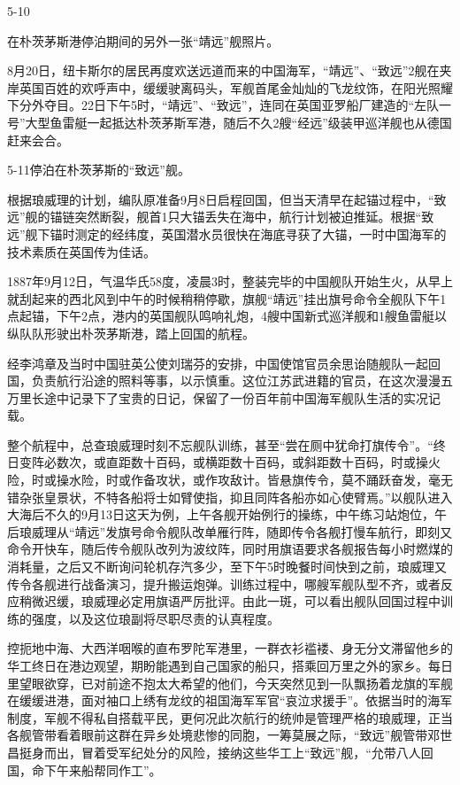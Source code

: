 \documentclass[12pt,UTF8]{ctexbook}
\begin{document}
5-10

在朴茨茅斯港停泊期间的另外一张“靖远”舰照片。

8月20日，纽卡斯尔的居民再度欢送远道而来的中国海军，“靖远”、“致远”2舰在夹岸英国百姓的欢呼声中，缓缓驶离码头，军舰首尾金灿灿的飞龙纹饰，在阳光照耀下分外夺目。22日下午5时，“靖远”、“致远”，连同在英国亚罗船厂建造的“左队一号”大型鱼雷艇一起抵达朴茨茅斯军港，随后不久2艘“经远”级装甲巡洋舰也从德国赶来会合。

5-11停泊在朴茨茅斯的“致远”舰。

根据琅威理的计划，编队原准备9月8日启程回国，但当天清早在起锚过程中，“致远”舰的锚链突然断裂，舰首1只大锚丢失在海中，航行计划被迫推延。根据“致远”舰下锚时测定的经纬度，英国潜水员很快在海底寻获了大锚，一时中国海军的技术素质在英国传为佳话。

1887年9月12日，气温华氏58度，凌晨3时，整装完毕的中国舰队开始生火，从早上就刮起来的西北风到中午的时候稍稍停歇，旗舰“靖远”挂出旗号命令全舰队下午1点起锚，下午2点，港内的英国舰队鸣响礼炮，4艘中国新式巡洋舰和1艘鱼雷艇以纵队队形驶出朴茨茅斯港，踏上回国的航程。

经李鸿章及当时中国驻英公使刘瑞芬的安排，中国使馆官员余思诒随舰队一起回国，负责航行沿途的照料等事，以示慎重。这位江苏武进籍的官员，在这次漫漫五万里长途中记录下了宝贵的日记，保留了一份百年前中国海军舰队生活的实况记载。

整个航程中，总查琅威理时刻不忘舰队训练，甚至“尝在厕中犹命打旗传令”。“终日变阵必数次，或直距数十百码，或横距数十百码，或斜距数十百码，时或操火险，时或操水险，时或作备攻状，或作攻敌计。皆悬旗传令，莫不踊跃奋发，毫无错杂张皇景状，不特各船将士如臂使指，抑且同阵各船亦如心使臂焉。”以舰队进入大海后不久的9月13日这天为例，上午各舰开始例行的操练，中午练习站炮位，午后琅威理从“靖远”发旗号命令舰队改单雁行阵，随即传令各舰打慢车航行，即刻又命令开快车，随后传令舰队改列为波纹阵，同时用旗语要求各舰报告每小时燃煤的消耗量，之后又不断询问轮机存汽多少，至下午5时晚餐时间快到之前，琅威理又传令各舰进行战备演习，提升搬运炮弹。训练过程中，哪艘军舰队型不齐，或者反应稍微迟缓，琅威理必定用旗语严厉批评。由此一斑，可以看出舰队回国过程中训练的强度，以及这位琅副将尽职尽责的认真程度。

控扼地中海、大西洋咽喉的直布罗陀军港里，一群衣衫褴褛、身无分文滞留他乡的华工终日在港边观望，期盼能遇到自己国家的船只，搭乘回万里之外的家乡。每日里望眼欲穿，已对前途不抱太大希望的他们，今天突然见到一队飘扬着龙旗的军舰在缓缓进港，面对袖口上绣有龙纹的祖国海军军官“哀泣求援手”。依据当时的海军制度，军舰不得私自搭载平民，更何况此次航行的统帅是管理严格的琅威理，正当各舰管带看着眼前这群在异乡处境悲惨的同胞，一筹莫展之际，“致远”舰管带邓世昌挺身而出，冒着受军纪处分的风险，接纳这些华工上“致远”舰，“允带八人回国，命下午来船帮同作工”。
\end{document}
